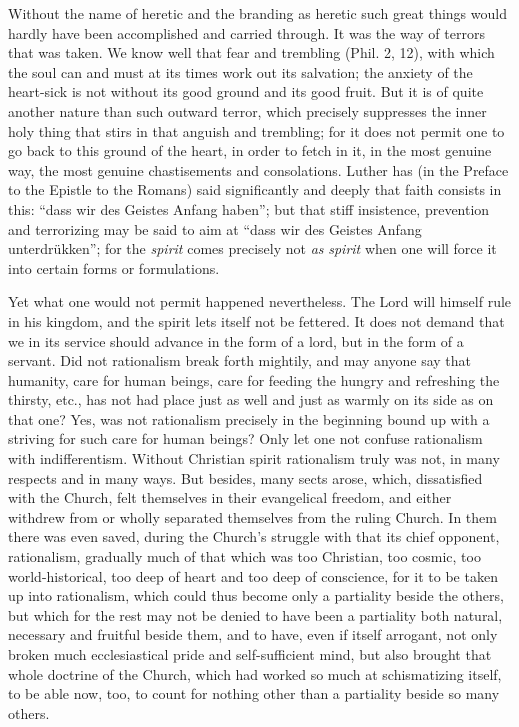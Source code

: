 \documentclass[12pt,a4paper,openany]{book}
\newcommand{\opage}[1]{\marginnote{\footnotesize\textit{[#1]}}}
\begin{document}
Without the name of heretic and the branding as heretic such great things would
hardly have been accomplished and carried through. It was the way of terrors that
was taken. We know well that fear and trembling (Phil. 2, 12), with which the soul
can and must at its times work out its salvation; the anxiety of the heart-sick is
not without its good ground and its good fruit. But it is of quite another nature
than such outward terror, which precisely suppresses the inner holy thing that stirs
in that anguish and trembling; for it does not permit one to go back to this ground
of the heart, in order to fetch in it, in the most genuine
\setcounter{footnote}{0}%
\opage{136}way, the most genuine chastisements and consolations. Luther has (in the Preface
to the Epistle to the Romans) said significantly and deeply that faith consists in
this: ``dass wir des Geistes Anfang haben''; but that stiff insistence, prevention
and terrorizing may be said to aim at ``dass wir des Geistes Anfang unterdrükken'';
for the \emph{spirit} comes precisely not \emph{as} \emph{spirit} when one will force
it into certain forms or formulations.


Yet what one would not permit happened nevertheless. The Lord will himself rule in
his kingdom, and the spirit lets itself not be fettered. It does not demand that we
in its service should advance in the form of a lord, but in the form of a servant.
Did not rationalism break forth mightily, and may anyone say that humanity, care for
human beings, care for feeding the hungry and refreshing the thirsty, etc., has not
had place just as well and just as warmly on its side as on that one? Yes, was not
rationalism precisely in the beginning bound up with a striving for such care for
human beings? Only let one not confuse rationalism with indifferentism. Without
Christian spirit rationalism truly was not, in many respects and in many ways. But
besides, many sects arose, which, dissatisfied with the Church, felt themselves in
their evangelical freedom, and either withdrew from or wholly separated themselves
from the ruling Church. In them there was even saved, during the Church's struggle
with that its chief opponent, rationalism, gradually much of that which was too
Christian, too cosmic, too world-historical, too deep of heart and too deep of
conscience, for it to be taken up into rationalism, which could thus become only a
partiality beside the others, but which for the rest may not be denied to have been a
partiality both natural, necessary and fruitful beside them, and to have, even if
itself arrogant, not only broken much ecclesiastical pride and self-sufficient mind,
but also brought that whole doctrine of the Church, which had worked so much at
\setcounter{footnote}{0}%
\opage{137}schismatizing itself, to be able now, too, to count for nothing other than a
partiality beside so many others.
\end{document}
